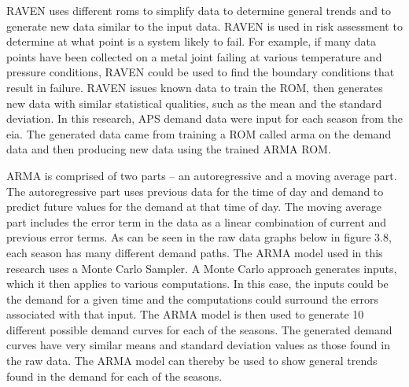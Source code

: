 RAVEN uses different \ac{roms} to simplify data to determine general trends and to generate new data similar to the input data. RAVEN is used in risk assessment to determine at what point is a system likely to fail. For example, if many data points have been collected on a metal joint failing at various temperature and pressure conditions, RAVEN could be used to find the boundary conditions that result in failure. RAVEN issues known data to train the ROM, then generates new data with similar statistical qualities, such as the mean and the standard deviation. In this research, APS demand data were input for each season from the \ac{eia}. The generated data came from training a ROM called \ac{arma} on the demand data and then producing new data using the trained ARMA ROM.

ARMA is comprised of two parts – an autoregressive and a moving average part.  The autoregressive part uses previous data for the time of day and demand to predict future values for the demand at that time of day. The moving average part includes the error term in the data as a linear combination of current and previous error terms. As can be seen in the raw data graphs below in figure 3.8, each season has many different demand paths. The ARMA model used in this research uses a Monte Carlo Sampler.  A Monte Carlo approach generates inputs, which it then applies to various computations. In this case, the inputs could be the demand for a given time and the computations could surround the errors associated with that input. The ARMA model is then used to generate 10 different possible demand curves for each of the seasons.  The generated demand curves have very similar means and standard deviation values as those found in the raw data. The ARMA model can thereby be used to show general trends found in the demand for each of the seasons.



